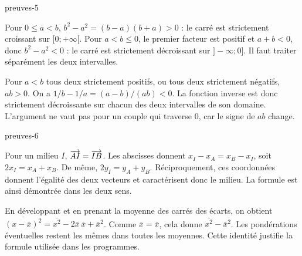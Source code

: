 \begin{blocEdition}{preuves-5}
\begin{demonstration}
Pour $0\le a<b$, $b^2-a^2=(b-a)(b+a)>0$ : le carré est strictement croissant sur $[0;+\infty[$. Pour $a<b\le0$, le premier facteur est positif et $a+b<0$, donc $b^2-a^2<0$ : le carré est strictement décroissant sur $]-\infty;0]$. Il faut traiter séparément les deux intervalles.
\end{demonstration}
\begin{demonstration}
Pour $a<b$ tous deux strictement positifs, ou tous deux strictement négatifs, $ab>0$. On a $1/b-1/a=(a-b)/(ab)<0$. La fonction inverse est donc strictement décroissante sur chacun des deux intervalles de son domaine. L’argument ne vaut pas pour un couple qui traverse 0, car le signe de $ab$ change.
\end{demonstration}

\end{blocEdition}
\begin{blocEdition}{preuves-6}
\begin{demonstration}
Pour un milieu $I$, $\overrightarrow{AI}=\overrightarrow{IB}$. Les abscisses donnent $x_I-x_A=x_B-x_I$, soit $2x_I=x_A+x_B$. De même, $2y_I=y_A+y_B$. Réciproquement, ces coordonnées donnent l’égalité des deux vecteurs et caractérisent donc le milieu. La formule est ainsi démontrée dans les deux sens.
\end{demonstration}
\begin{demonstration}
En développant et en prenant la moyenne des carrés des écarts, on obtient $\overline{(x-\bar x)^2}=\overline{x^2}-2\bar x\,\overline{x}+\bar x^2$. Comme $\overline{x}=\bar x$, cela donne $\overline{x^2}-\bar x^2$. Les pondérations éventuelles restent les mêmes dans toutes les moyennes. Cette identité justifie la formule utilisée dans les programmes.
\end{demonstration}

\end{blocEdition}
